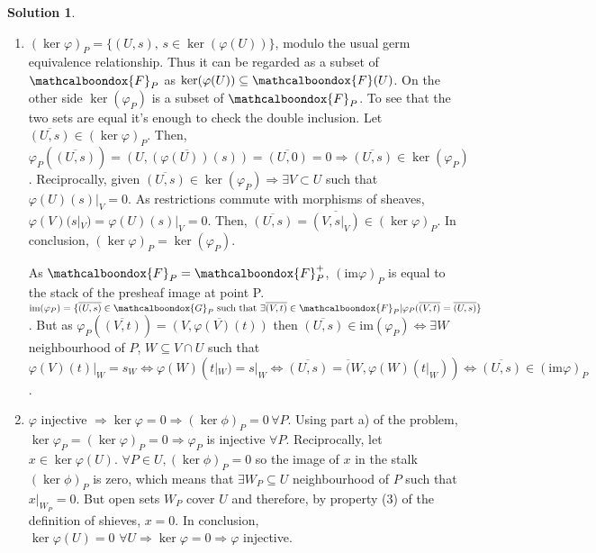 \documentclass[12pt]{article}
\newcommand{\imp}{\ensuremath{\Rightarrow}}
\newcommand{\ima}{\ensuremath{\mathrm{im}}}
\theoremstyle{definition}
\newtheorem*{sol}{Solution}
\newcommand{\sF}{\ensuremath{\mathcalboondox{F}}}
\newcommand{\sG}{\ensuremath{\mathcalboondox{G}}}
\begin{document}
\begin{sol}
	\begin{enumerate}[label=\alph*)]
		\item $(\ker \varphi)_P = \{(U,s), \, s \in \ker(\varphi(U))\}$, modulo the usual germ equivalence relationship. Thus it can be regarded as a subset of $\sF_P$ as $\ker(\varphi(U)) \subseteq \sF(U)$. On the other side $\ker(\varphi_P)$ is a subset of $\sF_P$. To see that the two sets are equal it's enough to check the double inclusion. Let $\overline{(U,s)} \in (\ker \varphi)_P$. Then, $\varphi_P(\overline{(U,s)}) = \overline{(U, (\varphi(U))(s))} = \overline{(U,0)} = 0 \imp \overline{(U,s)} \in \ker(\varphi_P)$. Reciprocally, given $\overline{(U,s)} \in \ker(\varphi_P) \imp \exists V \subset U$ such that $\varphi(U)(s)|_V = 0$. As restrictions commute with morphisms of sheaves, $ \varphi(V)(s|_V) = \varphi(U)(s)|_V = 0$. Then, $\overline{(U,s)} = \overline{(V,s|_V)} \in (\ker\varphi)_P$. In conclusion, $(\ker \varphi)_P = \ker(\varphi_P)$.

		As $\sF_P = \sF^{+}_P$, $(\ima \varphi)_P$ is equal to the stack of the presheaf image at point P. $\ima (\varphi_P) = \{\overline{(U,s)} \in \sG_P \text{ such that } \exists \overline{(V,t)} \in \sF_P | \varphi_P(\overline{(V,t)} = \overline{(U,s)}\}$. But as $\varphi_P(\overline{(V,t)}) = \overline{(V, \varphi(V)(t))}$ then $\overline{(U,s)} \in \ima (\varphi_P) \iff \exists W$ neighbourhood of $P$, $W \subseteq V \cap U$ such that $\varphi(V)(t)|_W = s_W \iff \varphi(W)(t|_W) = s|_W \iff \overline{(U,s)} = \overline(W,\varphi(W)(t|_W)) \iff \overline{(U,s)} \in (\ima \varphi)_P$.

		\item $\varphi$ injective $\imp \ker \varphi = 0 \imp (\ker \phi)_P = 0 \, \forall P$. Using part a) of the problem, $\ker \varphi_P = (\ker \varphi)_P = 0 \imp \varphi_P$ is injective $\forall P$. Reciprocally, let $x \in \ker \varphi(U)$. $\forall P \in U, (\ker \phi)_P = 0$ so the image of $x$ in the stalk $(\ker \phi)_P$ is zero, which means that $\exists W_P \subseteq U$ neighbourhood of $P$ such that $x|_{W_P} = 0$. But open sets $W_P$ cover $U$ and therefore, by property (3) of the definition of shieves, $x = 0$. In conclusion, $\ker \varphi(U) = 0 \, \, \forall U \imp \ker \varphi = 0 \imp \varphi$ injective.


\end{enumerate}
\end{sol}
\end{document}
